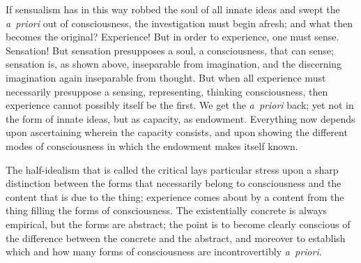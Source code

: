 \documentclass[12pt]{book}
\begin{document}
If sensualism has in this way robbed the soul of all innate ideas and swept
the \textit{a~priori} out of consciousness, the investigation must begin
afresh; and what then becomes the original? Experience! But in order to
experience, one must sense. Sensation! But sensation presupposes a soul, a
consciousness, that can sense; sensation is, as shown above, inseparable from
imagination, and the discerning imagination again inseparable from thought.
But when all experience must necessarily presuppose a sensing, representing,
thinking consciousness, then experience cannot possibly itself be the first.
We get the \textit{a~priori} back; yet not in the form of innate ideas, but
as capacity, as endowment. Everything now depends upon ascertaining wherein
the capacity consists, and upon showing the different modes of consciousness
in which the endowment makes itself known.

The half-idealism that is called the critical lays particular stress upon a
sharp distinction between the forms that necessarily belong to consciousness
and the content that is due to the thing; experience comes about by a content
from the thing filling the forms of consciousness. The existentially concrete
is always empirical, but the forms are abstract; the point is to become
clearly conscious of the difference between the concrete and the abstract, and
moreover to establish which and how many forms of consciousness are
incontrovertibly \textit{a~priori}.
\end{document}
